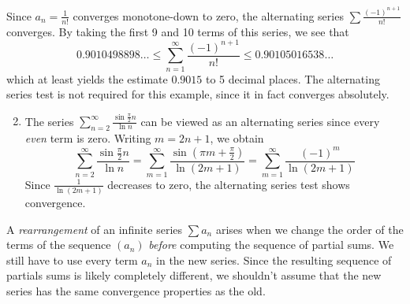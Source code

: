 \begin{examples}{}{}
	\exstart Since $a_n=\frac 1{n!}$ converges monotone-down to zero, the alternating series $\sum\frac{(-1)^{n+1}}{n!}$ converges. By taking the first 9 and 10 terms of this series, we see that
	\[0.9010498898\ldots\le\sum_{n=1}^\infty\frac{(-1)^{n+1}}{n!}\le 0.90105016538\ldots\]
	which at least yields the estimate $0.9015$ to 5 decimal places. The alternating series test is not required for this example, since it in fact converges absolutely.
	\begin{enumerate}\setcounter{enumi}{1}
	  \item The series $\sum_{n=2}^\infty\frac{\sin\frac\pi 2n}{\ln n}$ can be viewed as an alternating series since every \emph{even} term is zero. Writing $m=2n+1$, we obtain
	  \[
	  	\sum_{n=2}^\infty\frac{\sin\frac\pi 2n}{\ln n} =\sum_{m=1}^\infty\frac{\sin(\pi m+\frac\pi 2)}{\ln(2m+1)}= \sum_{m=1}^\infty\frac{(-1)^{m}}{\ln(2m+1)} 
	  \]
	  Since $\frac 1{\ln(2m+1)}$ decreases to zero, the alternating series test shows convergence.
	\end{enumerate}
\end{examples}

\medskip


A \emph{rearrangement} of an infinite series $\sum a_n$ arises when we change the order of the terms of the sequence $(a_n)$ \emph{before} computing the sequence of partial sums. We still have to use every term $a_n$ in the new series. Since the resulting sequence of partials sums is likely completely different, we shouldn't assume that the new series has the same convergence properties as the old.


